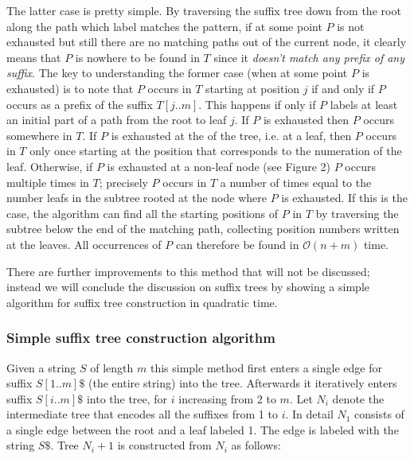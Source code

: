\documentclass[a4paper,12pt, oneside]{article}
\begin{document}
The latter case is pretty simple. By traversing the suffix tree down from the root along the path which label matches the pattern, if at some point $P$ is not exhausted but still there are no matching paths out of the current node, it clearly means that $P$ is nowhere to be found in $T$ since it \textit{doesn't match any prefix of any suffix}. The key to understanding the former case (when at some point $P$ is exhausted) is to note that $P$ occurs in $T$ starting at position $j$ if and only if $P$ occurs as a prefix of the suffix $T[j..m]$. This happens if only if $P$ labels at least an initial part of a path from the root to leaf $j$. If $P$ is exhausted then $P$ occurs somewhere in $T$.
If $P$ is exhausted at the  of the tree, i.e. at a leaf, then $P$ occurs in $T$ only once starting at the position that corresponds to the numeration of the leaf. Otherwise, if $P$ is exhausted at a non-leaf node (see Figure 2) $P$ occurs multiple times in $T$; precisely $P$ occurs in $T$ a number of times equal to the number leafs in the subtree rooted at the node where $P$ is exhausted. If this is the case, the algorithm can find all the starting positions of $P$ in $T$ by traversing the subtree below the end of the matching path, collecting position numbers written at the leaves. All occurrences of $P$ can therefore be found in $\mathcal{O}(n+m)$ time. 
\par
There are further improvements to this method that will not be discussed; instead we will conclude the discussion on suffix trees by showing a simple algorithm for suffix tree construction in quadratic time.

\subsubsection{Simple suffix tree construction algorithm}
Given a string $S$ of length $m$ this simple method first enters a single edge for suffix $S[1..m]\$$ (the entire string) into the tree. Afterwards it iteratively enters suffix $S[i..m]\$$ into the tree, for $i$ increasing from 2 to $m$. Let $N_i$ denote the intermediate tree that encodes all the suffixes from 1 to $i$. In detail $N_1$ consists of a single edge between the root and a leaf labeled 1. The edge is labeled with the string $S\$$. Tree $N_i+1$ is constructed from $N_i$ as follows: 
\end{document}

